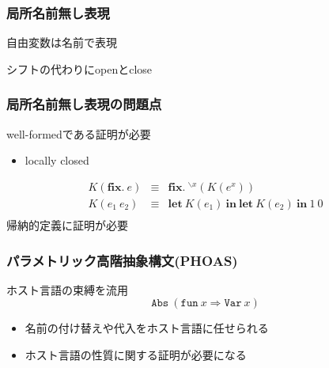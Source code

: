 \documentclass[dvipdfmx,cjk,xcolor=dvipsnames,envcountsect,notheorems,12pt]{beamer}
\theoremstyle{definition}
\newcommand{\keyword}[1]{\mathbf{#1}}
\newcommand{\LET}{\keyword{let}}
\newcommand{\FIX}{\keyword{fix}}
\newcommand{\IN}{\keyword{in}}
\begin{document}
\begin{frame}
	\frametitle{局所名前無し表現}
	\LARGE 自由変数は名前で表現

	\vfill 

	シフトの代わりにopenとclose

\end{frame}

\begin{frame}
	\frametitle{局所名前無し表現の問題点}
	\LARGE well-formedである証明が必要
	\begin{itemize}
		\item locally closed
	\end{itemize}

	\vfill

	{\large \[\begin{array}{rcl}
		K(\FIX.~e) & \equiv & \FIX.~{}^{\backslash x}(K(e^x)) \\
		K(e_1~e_2) & \equiv & \LET~ K(e_1)~\IN~\LET~K(e_2)~\IN~1~0 \\
	\end{array}\]}
	帰納的定義に証明が必要
\end{frame}

\begin{frame}
	\frametitle{パラメトリック高階抽象構文(PHOAS)}
	\LARGE
	ホスト言語の束縛を流用
	\[\texttt{Abs}~(\texttt{fun}~x \Rightarrow \texttt{Var}~x)\]

	\begin{itemize}
		\item 名前の付け替えや代入をホスト言語に任せられる
		\item ホスト言語の性質に関する証明が必要になる
	\end{itemize}
\end{frame}
\end{document}
